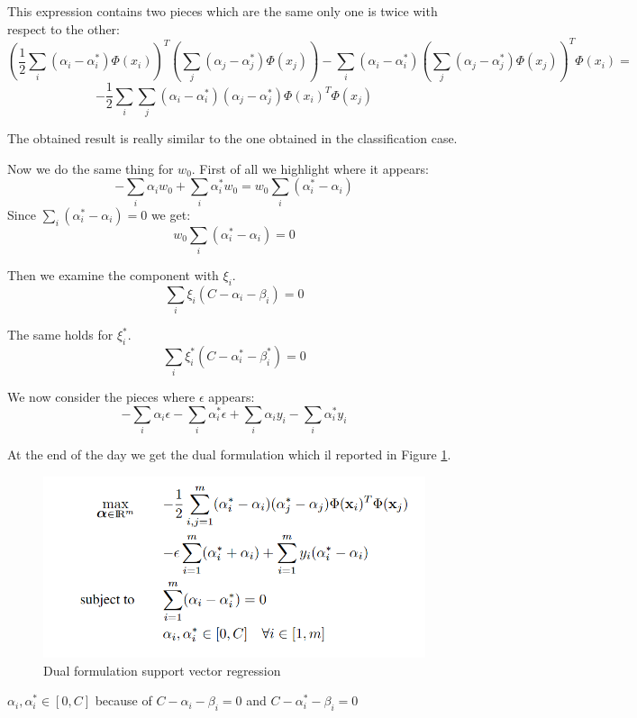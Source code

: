 This expression contains two pieces which are the same only one is twice with respect to the other:
$$(\frac{1}{2}\sum_i (\alpha_i - \alpha_i^*) \Phi(x_i))^T (\sum_j (\alpha_j - \alpha_j^*) \Phi(x_j)) - \sum_i(\alpha_i - \alpha_i^*) (\sum_j (\alpha_j - \alpha_j^*) \Phi(x_j))^T \Phi(x_i) = $$
$$-\frac{1}{2} \sum_i \sum_j (\alpha_i - \alpha_i^*) (\alpha_j - \alpha_j^*) \Phi(x_i)^T \Phi(x_j)$$

The obtained result is really similar to the one obtained in the classification case. \newline

Now we do the same thing for $w_0$. First of all we highlight where it appears:
$$- \sum_i \alpha_i w_0 + \sum_i \alpha_i^* w_0 = w_0 \sum_i (\alpha_i^* - \alpha_i)$$
Since $\sum_i (\alpha_i^* - \alpha_i) = 0$ we get:
$$w_0 \sum_i (\alpha_i^* - \alpha_i) = 0$$

Then we examine the component with $\xi_i$.
$$\sum_i \xi_i (C - \alpha_i - \beta_i) = 0$$

The same holds for $\xi_i^*$.
$$\sum_i \xi_i^* (C - \alpha_i^* - \beta_i^*) = 0$$

We now consider the pieces where $\epsilon$ appears:
$$- \sum_i \alpha_i \epsilon - \sum_i \alpha_i^* \epsilon + \sum_i \alpha_i y_i - \sum_i \alpha_i^* y_i$$

At the end of the day we get the dual formulation which il reported in Figure \ref{fig:svm_regression_dual}.

\begin{figure}[ht]
    \centering
    \includegraphics[scale=0.4]{images/svm_regression_dualFormulation.png}
    \caption{Dual formulation support vector regression}
    \label{fig:svm_regression_dual}
\end{figure}

$\alpha_i, \alpha_i^* \in [0,C]$ because of $C - \alpha_i - \beta_i = 0$ and $C - \alpha_i^* - \beta_i = 0$ \newline

